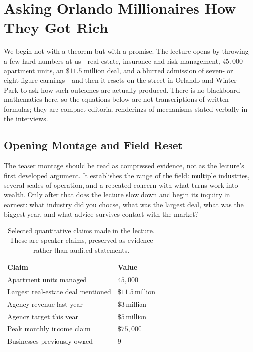 \chapter{Asking Orlando Millionaires How They Got Rich}

We begin not with a theorem but with a promise. The lecture opens by throwing a few hard numbers at us---real estate, insurance and risk management, \(45{,}000\) apartment units, an \(\$11.5\) million deal, and a blurred admission of seven- or eight-figure earnings---and then it resets on the street in Orlando and Winter Park to ask how such outcomes are actually produced. There is no blackboard mathematics here, so the equations below are not transcriptions of written formulas; they are compact editorial renderings of mechanisms stated verbally in the interviews.

\section{Opening Montage and Field Reset}

The teaser montage should be read as compressed evidence, not as the lecture's first developed argument. It establishes the range of the field: multiple industries, several scales of operation, and a repeated concern with what turns work into wealth. Only after that does the lecture slow down and begin its inquiry in earnest: what industry did you choose, what was the largest deal, what was the biggest year, and what advice survives contact with the market?

\begin{table}[h]
\centering
\begin{tabular}{|l|l|}
\hline
Claim & Value \\
\hline
Apartment units managed & \(45{,}000\) \\
Largest real-estate deal mentioned & \(\$11.5\,\text{million}\) \\
Agency revenue last year & \(\$3\,\text{million}\) \\
Agency target this year & \(\$5\,\text{million}\) \\
Peak monthly income claim & \(\$75{,}000\) \\
Businesses previously owned & \(9\) \\
\hline
\end{tabular}
\caption{Selected quantitative claims made in the lecture. These are speaker claims, preserved as evidence rather than audited statements.}
\end{table}

